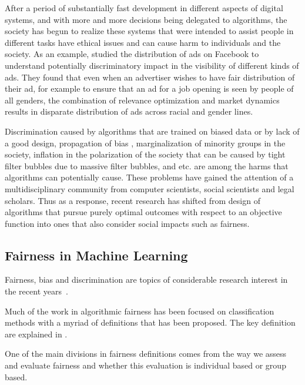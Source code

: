 
After a period of substantially fast development in different aspects of digital systems, and with more and more decisions being delegated to algorithms, the society has begun to realize these systems that were intended to assist people in different tasks have ethical issues and can cause harm to individuals and the society. As an example, \cite{1Muhammad2019facebookads} studied the distribution of ads on Facebook to understand potentially discriminatory impact in the visibility of different kinds of ads. They found that even when an advertiser wishes to have fair distribution of their ad, for example to ensure that an ad for a job opening is seen by people of all genders, the combination of relevance optimization and market dynamics results in disparate distribution of ads across racial and gender lines. 

Discrimination caused by algorithms that are trained on biased data or by lack of a good design, propagation of bias \cite{barocas2016big}, marginalization of minority groups in the society, inflation in the polarization of the society that can be caused by tight filter bubbles due to massive filter bubbles, and etc. are among the harms that algorithms can potentially cause. These problems have gained the attention of a multidisciplinary community from computer scientists, social scientists and legal scholars. Thus as a response, recent research has shifted from design of algorithms that pursue purely optimal outcomes with respect to an objective function into ones that also consider social impacts such as fairness.

\subsection{Fairness in Machine Learning}
Fairness, bias and discrimination are topics of considerable research interest in the recent years~\cite{pedreshi2008discrimination,fairness,bozdag_bias_2013}.

Much of the work in algorithmic fairness has been focused on classification methods with a myriad of definitions that has been proposed. The key definition are explained in \cite{mitchell2021algorithmic}.

One of the main divisions in fairness definitions comes from the way we assess and evaluate fairness and whether this evaluation is individual based or group based.

